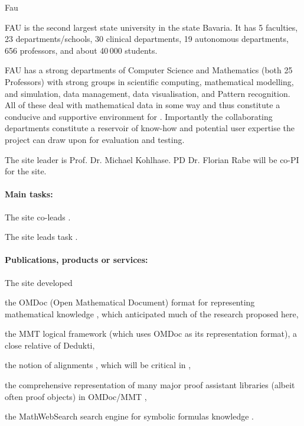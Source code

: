 \begin{sitedescription}{Fau}

  
FAU is the second largest state university in the state Bavaria.
It has 5 faculties, 23 departments/schools, 30 clinical departments, 19 autonomous departments, 656 professors, and about 40\,000 students.

FAU has a strong departments of Computer Science and Mathematics (both 25 Professors) with strong groups in scientific computing, mathematical modelling, and simulation, data management, data visualisation, and Pattern recognition.
All of these deal with mathematical data in some way and thus constitute a conducive and supportive environment for \pn.
Importantly the collaborating departments constitute a reservoir of know-how and potential user expertise the \pn project can draw upon for evaluation and testing.

The site leader is Prof. Dr. Michael Kohlhase.
PD Dr. Florian Rabe will be co-PI for the site.

\paragraph*{Main tasks:}

\begin{compactitem}
\item The site co-leads .
\item The site leads task .
\end{compactitem}

\paragraph*{Publications, products or services:}

The site developed 
\begin{compactitem}
 \item the OMDoc (Open Mathematical Document) format for representing mathematical knowledge \cite{Kohlhase:OMDoc1.2}, which anticipated much of the research proposed here,
 \item the MMT logical framework \cite{RabKoh:WSMSML13} (which uses OMDoc as its representation format), a close relative of Dedukti,
 \item the notion of alignments \cite{GKKMR:alignments:17}, which will be critical in ,
 \item the comprehensive representation of many major proof assistant libraries (albeit often proof objects) in OMDoc/MMT \cite{KR:oafexp:20},
 \item the MathWebSearch search engine for symbolic formulas knowledge \cite{ProKoh:mwssofse12}.
\end{compactitem}


\end{sitedescription}
